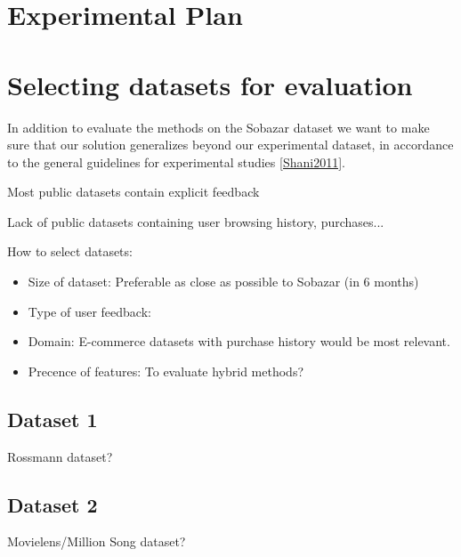 \section{Experimental Plan}



\section{Selecting datasets for evaluation}

In addition to evaluate the methods on the Sobazar dataset we want to make sure that our solution generalizes beyond our experimental dataset, in accordance to the general guidelines for experimental studies \ref{Shani2011}.

Most public datasets contain explicit feedback

Lack of public datasets containing user browsing history, purchases...

How to select datasets:

\begin{itemize}
	\item Size of dataset: Preferable as close as possible to Sobazar (in 6 months)
	\item Type of user feedback:
	\item Domain: E-commerce datasets with purchase history would be most relevant.
	\item Precence of features: To evaluate hybrid methods?
\end{itemize} 




\subsection{Dataset 1}

Rossmann dataset?


\subsection{Dataset 2}

Movielens/Million Song dataset?



